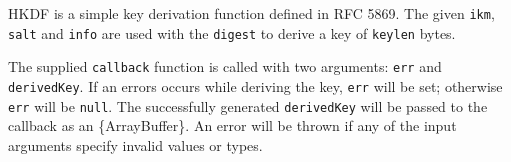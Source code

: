 HKDF is a simple key derivation function defined in RFC 5869. The given
\texttt{ikm}, \texttt{salt} and \texttt{info} are used with the
\texttt{digest} to derive a key of \texttt{keylen} bytes.

The supplied \texttt{callback} function is called with two arguments:
\texttt{err} and \texttt{derivedKey}. If an errors occurs while deriving
the key, \texttt{err} will be set; otherwise \texttt{err} will be
\texttt{null}. The successfully generated \texttt{derivedKey} will be
passed to the callback as an \{ArrayBuffer\}. An error will be thrown if
any of the input arguments specify invalid values or types.

\begin{Shaded}
\begin{Highlighting}[]
\NormalTok{ \{ }\NormalTok{ \} } \OperatorTok{;}
\NormalTok{ \{}
\OperatorTok{,}
\NormalTok{\} }\OperatorTok{=}  \NormalTok{(}\NormalTok{)}\OperatorTok{;}

\NormalTok{(}\OperatorTok{,} \OperatorTok{,} \OperatorTok{,} \OperatorTok{,} \OperatorTok{,}\OperatorTok{,}\KeywordTok{=\textgreater{}}\NormalTok{ \{}
  \OperatorTok{;}
  \NormalTok{(}\NormalTok{(}\NormalTok{))}\OperatorTok{;}  
\NormalTok{\})}\OperatorTok{;}
\end{Highlighting}
\end{Shaded}

